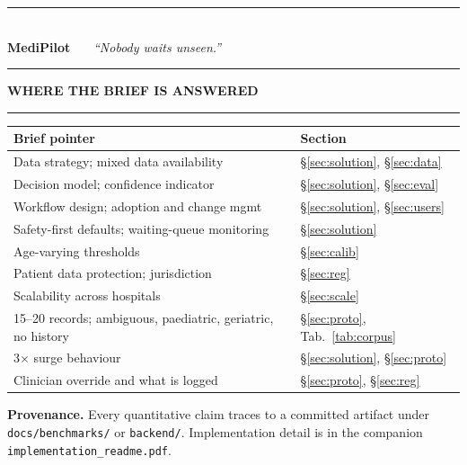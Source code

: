 \documentclass[10pt,a4paper,twocolumn]{article}
\newcommand{\pth}[1]{\textcolor{SecPurple}{\texttt{#1}}}
\begin{document}
\vspace{6pt}
\noindent\parbox{\linewidth}{%
  \textcolor{AccPurple}{\rule{\linewidth}{1pt}}\\[3pt]
  \centering\sffamily\footnotesize
  \textcolor{AccPurple}{\bfseries Medi}{\bfseries Pilot} \ \textbullet\ \
  \textit{``Nobody waits unseen.''}\\[3pt]
  \textcolor{Border}{\rule{\linewidth}{0.5pt}}}

\vspace{6pt}
{\sffamily\bfseries\small\color{NearBlack}WHERE THE BRIEF IS ANSWERED}\par
\vspace{-1pt}\noindent\textcolor{AccPurple}{\rule{\linewidth}{1pt}}\par\vspace{3pt}

{\footnotesize\sffamily
\begin{tabular}{@{}p{5.85cm}p{1.55cm}@{}}
\toprule
\rowcolor{AccPurple!10}
\textbf{Brief pointer} & \textbf{Section}\\
\midrule
Data strategy; mixed data availability & \S\ref{sec:solution}, \S\ref{sec:data}\\
Decision model; confidence indicator & \S\ref{sec:solution}, \S\ref{sec:eval}\\
Workflow design; adoption and change mgmt & \S\ref{sec:solution}, \S\ref{sec:users}\\
Safety-first defaults; waiting-queue monitoring & \S\ref{sec:solution}\\
Age-varying thresholds & \S\ref{sec:calib}\\
Patient data protection; jurisdiction & \S\ref{sec:reg}\\
Scalability across hospitals & \S\ref{sec:scale}\\
15--20 records; ambiguous, paediatric, geriatric, no history & \S\ref{sec:proto}, Tab.~\ref{tab:corpus}\\
3$\times$ surge behaviour & \S\ref{sec:solution}, \S\ref{sec:proto}\\
Clinician override and what is logged & \S\ref{sec:proto}, \S\ref{sec:reg}\\
\bottomrule
\end{tabular}}

\vspace{5pt}
{\scriptsize\color{MedGray}\textbf{Provenance.} Every quantitative claim traces to a
committed artifact under \pth{docs/benchmarks/} or \pth{backend/}. Implementation detail is in the
companion \pth{implementation\_readme.pdf}.}

\balance
\end{document}
